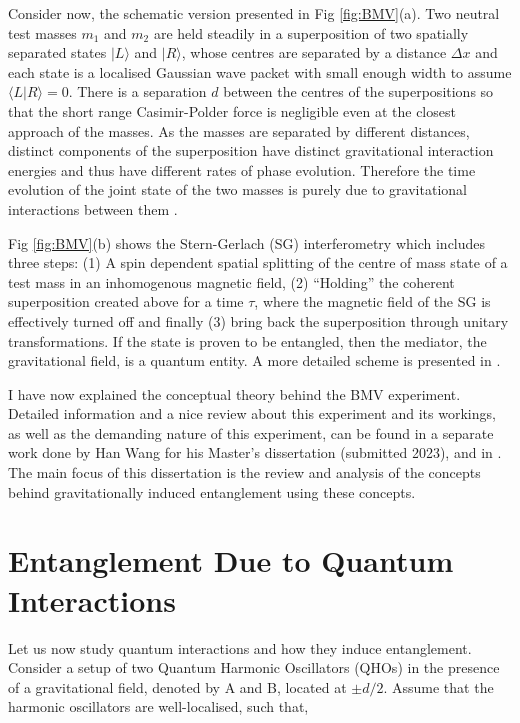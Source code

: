 \documentclass[12pt,a4paper]{report}
\theoremstyle{plain}
\theoremstyle{definition}
\theoremstyle{remark}
\begin{document}
 Consider now, the schematic version presented in Fig \ref{fig:BMV}(a). Two neutral test masses $m_1$ and $m_2$ are held steadily in a superposition of two spatially separated states $|L\rangle$ and  $|R\rangle$, whose centres are separated by a distance $\Delta x$ and each state is a localised Gaussian wave packet with small enough width to assume $\langle L|R\rangle = 0$. There is a separation $d$ between the centres of the superpositions so that the short range Casimir-Polder force is negligible even at the closest approach of the masses. As the masses are separated by different distances, distinct components of the superposition have distinct gravitational interaction energies and thus have different rates of phase evolution. Therefore the time evolution of the joint state of the two masses is purely due to gravitational interactions between them \cite{Bose_2017}.

Fig \ref{fig:BMV}(b) shows the Stern-Gerlach (SG) interferometry which includes three steps: (1) A spin dependent spatial splitting of the centre of mass state of a test mass in an inhomogenous magnetic field, (2) ``Holding'' the coherent superposition created above for a time $\tau$, where the magnetic field of the SG is effectively turned off and finally (3) bring back the superposition through unitary transformations. If the state is proven to be entangled, then the mediator, the gravitational field, is a quantum entity. A more detailed scheme is presented in \citet{Bose_2017}.

I have now explained the conceptual theory behind the BMV experiment. Detailed information and a nice review about this experiment and its workings, as well as the demanding nature of this experiment, can be found in a separate work done by Han Wang \cite{han} for his Master's dissertation (submitted 2023), and in \citet{Christodoulou_2020}. The main focus of this dissertation is the review and analysis of the concepts behind gravitationally induced entanglement using these concepts.

\section{Entanglement Due to Quantum Interactions} \label{sec: QHOs}
Let us now study quantum interactions and how they induce entanglement. Consider a setup of two Quantum Harmonic Oscillators (QHOs) in the presence of a gravitational field, denoted by A and B, located at $\pm d/2$. Assume that the harmonic oscillators are well-localised, such that,
\end{document}
